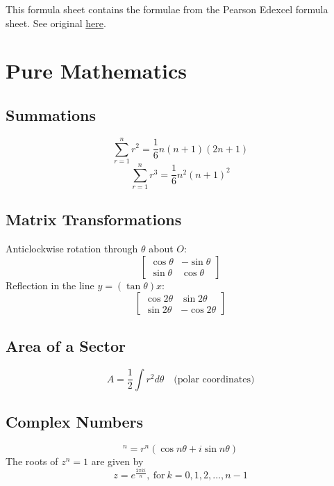 This formula sheet contains the formulae from the Pearson Edexcel formula sheet.
    See original \href{https://qualifications.pearson.com/content/dam/pdf/A%20Level/Mathematics/2017/specification-and-sample-assesment/pearson-edexcel-a-level-gce-in-mathematics-formulae-book.pdf}{here}.

\section{Pure Mathematics}
    \subsection{Summations}
    \begin{equation}
        \sum_{r=1}^nr^2=\frac{1}{6}n(n+1)(2n+1)
    \end{equation}
    \begin{equation}
        \sum_{r=1}^nr^3=\frac{1}{6}n^2(n+1)^2
    \end{equation}

    \subsection{Matrix Transformations}
    Anticlockwise rotation through $\theta$ about $O$:
    \begin{equation}
        \begin{bmatrix}
            \cos\theta & -\sin\theta \\
            \sin\theta & \cos\theta
        \end{bmatrix}
    \end{equation}
    Reflection in the line $y=(\tan\theta)x$:
    \begin{equation}
        \begin{bmatrix}
            \cos2\theta & \sin2\theta \\
            \sin2\theta & -\cos2\theta
        \end{bmatrix}
    \end{equation}

    \subsection{Area of a Sector}
    \begin{equation}
        A=\frac{1}{2}\int r^2d\theta\quad\text{(polar coordinates)}
    \end{equation}

    \subsection{Complex Numbers}
    \begin{equation}
        [r\cos\theta+i\sin\theta]^n=r^n(\cos n\theta+i\sin n\theta)
    \end{equation}
    The \glspl{root} of $z^n=1$ are given by
    \begin{equation}
        z=e^{\frac{2\pi ki}{n}},\ \text{for}\ k=0,1,2,\dots,n-1
    \end{equation}

